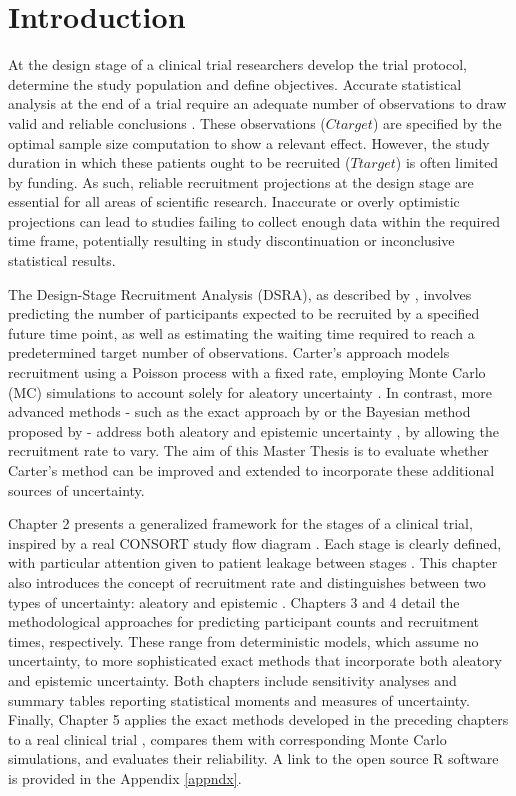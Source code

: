


\chapter{Introduction}

At the design stage of a clinical trial researchers develop the trial protocol, determine the study population and define objectives. Accurate statistical analysis at the end of a trial require an adequate number of observations to draw valid and reliable conclusions \citep{panos2023statistical}. These observations ($Ctarget$) are specified by the optimal sample size computation to show a relevant effect. However, the study duration in which these patients ought to be recruited ($Ttarget$) is often limited by funding. As such, reliable recruitment projections at the design stage are essential for all areas of scientific research. Inaccurate or overly optimistic projections can lead to studies failing to collect enough data within the required time frame, potentially resulting in study discontinuation or inconclusive statistical results.

The Design-Stage Recruitment Analysis (DSRA), as described by \cite{carter2004application}, involves predicting the number of participants expected to be recruited by a specified future time point, as well as estimating the waiting time required to reach a predetermined target number of observations. Carter's approach models recruitment using a Poisson process with a fixed rate, employing Monte Carlo (MC) simulations to account solely for aleatory uncertainty \citep{ohagan2006}. In contrast, more advanced methods - such as the exact approach by \cite{anisimov2007modelling} or the Bayesian method proposed by \cite{bagiella2001predicting} - address both aleatory and epistemic uncertainty \citep{ohagan2006}, by allowing the recruitment rate to vary. The aim of this Master Thesis is to evaluate whether Carter's method can be improved and extended to incorporate these additional sources of uncertainty.

Chapter 2 presents a generalized framework for the stages of a clinical trial, inspired by a real CONSORT study flow diagram \citep{schulz2010consort, hopewell2025consort}. Each stage is clearly defined, with particular attention given to patient leakage between stages \citep{desai2014preventing}. This chapter also introduces the concept of recruitment rate and distinguishes between two types of uncertainty: aleatory and epistemic \citep{ohagan2006}. Chapters 3 and 4 detail the methodological approaches for predicting participant counts and recruitment times, respectively. These range from deterministic models, which assume no uncertainty, to more sophisticated exact methods that incorporate both aleatory and epistemic uncertainty. Both chapters include sensitivity analyses and summary tables reporting statistical moments and measures of uncertainty. Finally, Chapter 5 applies the exact methods developed in the preceding chapters to a real clinical trial \citep{carter2004application}, compares them with corresponding Monte Carlo simulations, and evaluates their reliability. A link to the open source R software is provided in the Appendix \ref{appndx}.

